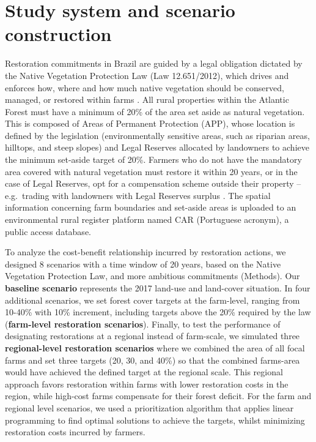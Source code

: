 \documentclass[
	12pt,				%
	oneside,			%
	a4paper,			%
	chapter=TITLE,		%
	section=TITLE,		%
	brazil,			%
	english				%
	]{abntex2}
\begin{document}
\hypertarget{study-system-and-scenario-construction}{%
\section{Study system and scenario construction}\label{study-system-and-scenario-construction}}

Restoration commitments in Brazil are guided by a legal obligation dictated by the Native Vegetation Protection Law (Law 12.651/2012), which drives and enforces how, where and how much native vegetation should be conserved, managed, or restored within farms \autocite{mello_achieving_2021,mello_integrating_2021}. All rural properties within the Atlantic Forest must have a minimum of 20\% of the area set aside as natural vegetation. This is composed of Areas of Permanent Protection (APP), whose location is defined by the legislation (environmentally sensitive areas, such as riparian areas, hilltops, and steep slopes) and Legal Reserves allocated by landowners to achieve the minimum set-aside target of 20\%. Farmers who do not have the mandatory area covered with natural vegetation must restore it within 20 years, or in the case of Legal Reserves, opt for a compensation scheme outside their property -- e.g.~trading with landowners with Legal Reserves surplus \autocite{mello_achieving_2021,mello_integrating_2021}. The spatial information concerning farm boundaries and set-aside areas is uploaded to an environmental rural register platform named CAR (Portuguese acronym), a public access database.

To analyze the cost-benefit relationship incurred by restoration actions, we designed 8 scenarios with a time window of 20 years, based on the Native Vegetation Protection Law, and more ambitious commitments (Methods). Our \textbf{baseline scenario} represents the 2017 land-use and land-cover situation. In four additional scenarios, we set forest cover targets at the farm-level, ranging from 10-40\% with 10\% increment, including targets above the 20\% required by the law (\textbf{farm-level restoration scenarios}). Finally, to test the performance of designating restorations at a regional instead of farm-scale, we simulated three \textbf{regional-level restoration scenarios} where we combined the area of all focal farms and set three targets (20, 30, and 40\%) so that the combined farms-area would have achieved the defined target at the regional scale. This regional approach favors restoration within farms with lower restoration costs in the region, while high-cost farms compensate for their forest deficit. For the farm and regional level scenarios, we used a prioritization algorithm \autocite{hanson_prioritizr_2020} that applies linear programming to find optimal solutions to achieve the targets, whilst minimizing restoration costs incurred by farmers.
\end{document}
